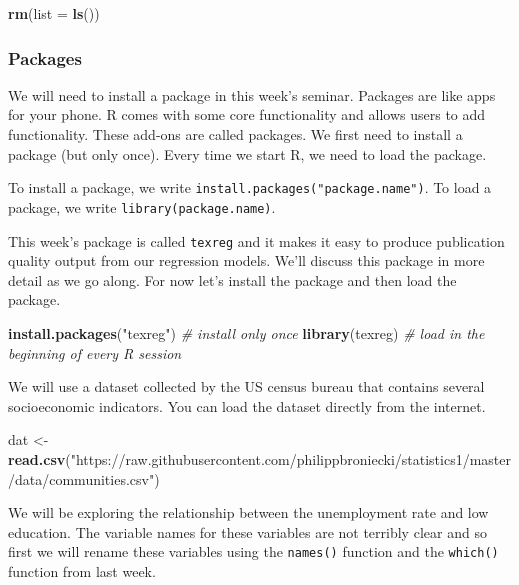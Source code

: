 \documentclass[]{article}
\newenvironment{Shaded}{\begin{snugshade}}{\end{snugshade}}
\newcommand{\KeywordTok}[1]{\textcolor[rgb]{0.13,0.29,0.53}{\textbf{#1}}}
\newcommand{\DataTypeTok}[1]{\textcolor[rgb]{0.13,0.29,0.53}{#1}}
\newcommand{\StringTok}[1]{\textcolor[rgb]{0.31,0.60,0.02}{#1}}
\newcommand{\CommentTok}[1]{\textcolor[rgb]{0.56,0.35,0.01}{\textit{#1}}}
\newcommand{\NormalTok}[1]{#1}
\theoremstyle{definition}
\theoremstyle{definition}
\theoremstyle{definition}
\theoremstyle{remark}
\begin{document}
\begin{Shaded}
\begin{Highlighting}[]
\KeywordTok{rm}\NormalTok{(}\DataTypeTok{list =} \KeywordTok{ls}\NormalTok{())}
\end{Highlighting}
\end{Shaded}

\subsubsection{Packages}\label{packages}

We will need to install a package in this week's seminar. Packages are
like apps for your phone. R comes with some core functionality and
allows users to add functionality. These add-ons are called packages. We
first need to install a package (but only once). Every time we start R,
we need to load the package.

To install a package, we write
\texttt{install.packages("package.name")}. To load a package, we write
\texttt{library(package.name)}.

This week's package is called \texttt{texreg} and it makes it easy to
produce publication quality output from our regression models. We'll
discuss this package in more detail as we go along. For now let's
install the package and then load the package.

\begin{Shaded}
\begin{Highlighting}[]
\KeywordTok{install.packages}\NormalTok{(}\StringTok{"texreg"}\NormalTok{) }\CommentTok{# install only once}
\KeywordTok{library}\NormalTok{(texreg) }\CommentTok{# load in the beginning of every R session}
\end{Highlighting}
\end{Shaded}

We will use a dataset collected by the US census bureau that contains
several socioeconomic indicators. You can load the dataset directly from
the internet.

\begin{Shaded}
\begin{Highlighting}[]
\NormalTok{dat <-}\StringTok{ }\KeywordTok{read.csv}\NormalTok{(}\StringTok{"https://raw.githubusercontent.com/philippbroniecki/statistics1/master/data/communities.csv"}\NormalTok{)}
\end{Highlighting}
\end{Shaded}

We will be exploring the relationship between the unemployment rate and
low education. The variable names for these variables are not terribly
clear and so first we will rename these variables using the
\texttt{names()} function and the \texttt{which()} function from last
week.
\end{document}
